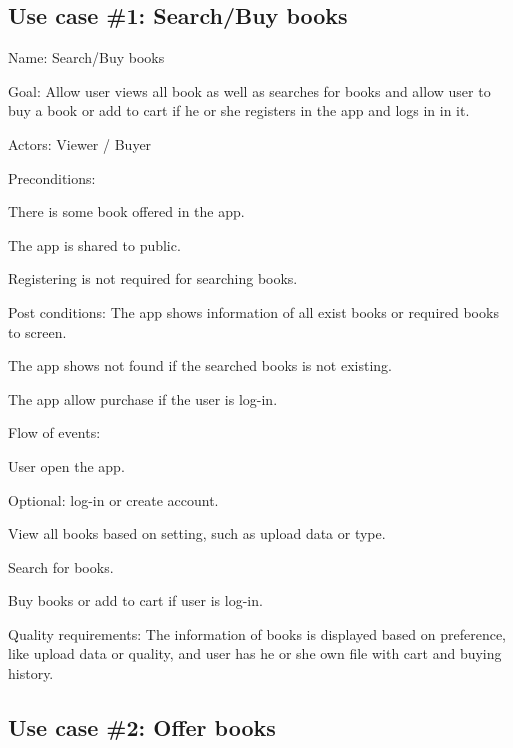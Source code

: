 \documentclass[12pt]{article}
\begin{document}
		\subsection{Use case \#1: Search/Buy books}
Name: Search/Buy books \par
Goal: Allow user views all book as well as searches for books and allow user to buy a book or add to cart if he or she registers in the app and logs in in it. \par
Actors: Viewer / Buyer \par
Preconditions: \par
\quad There is some book offered in the app. \par
\quad The app is shared to public. \par
\quad Registering is not required for searching books. \par
Post conditions:
        The app shows information of all exist books or required books to screen. \par
        	\quad The app shows not found if the searched books is not existing. \par
        \quad 	The app allow purchase if the user is log-in. \par
	Flow of events: \par
        	\quad User open the app. \par
        \quad 	Optional: log-in or create account. \par
        \quad 	View all books based on setting, such as upload data or type. \par
        \quad 	Search for books. \par
        \quad 	Buy books or add to cart if user is log-in. \par
Quality requirements: The information of books is displayed based on preference, like upload data or quality, and user has he or she own file with cart and buying history.  




		\subsection{Use case \#2: Offer books}
\end{document}
